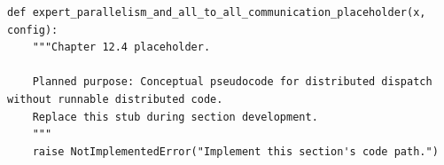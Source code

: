 \begin{lstlisting}[style=bookpython,caption={Planned code placeholder for expert parallelism and all to all communication.},label={lst:ch12-expert-parallelism-and-all-to-all-communication}]
def expert_parallelism_and_all_to_all_communication_placeholder(x, config):
    """Chapter 12.4 placeholder.

    Planned purpose: Conceptual pseudocode for distributed dispatch without runnable distributed code.
    Replace this stub during section development.
    """
    raise NotImplementedError("Implement this section's code path.")
\end{lstlisting}
